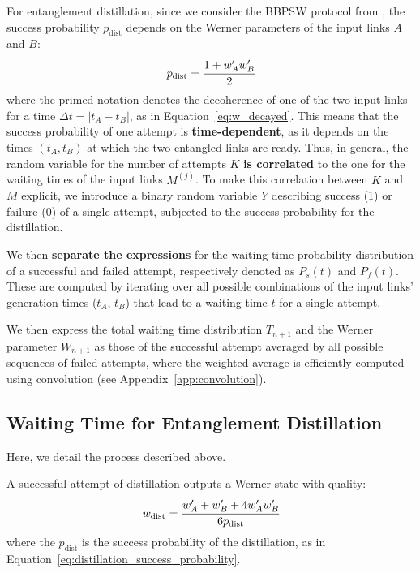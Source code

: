 \documentclass{masterthesis}
\begin{document}
For entanglement distillation, since we consider the BBPSW protocol from \textcite{bennett1996purification}, the success probability $p_\text{dist}$ depends on the Werner parameters of the input links $A$ and $B$:
\begin{equation}\label{eq:distillation_success_probability}
    p_\text{dist} = \cfrac{1+w_A'w_B'}{2}
\end{equation}
where the primed notation denotes the decoherence of one of the two input links for a time $\Delta t = |t_A - t_B|$, as in Equation~\ref{eq:w_decayed}.
This means that the success probability of one attempt is \textbf{time-dependent}, as it depends on the times $(t_A, t_B)$ at which the two entangled links are ready.
Thus, in general, the random variable for the number of attempts $K$ \textbf{is correlated} to the one for the waiting times of the input links $M^{(j)}$.
To make this correlation between $K$ and $M$ explicit, we introduce a binary random variable $Y$ describing success (1) or failure (0) of a single attempt, subjected to the success probability for the distillation.

We then \textbf{separate the expressions} for the waiting time probability distribution of a successful and failed attempt, respectively denoted as $P_s(t)$ and $P_f(t)$.
These are computed by iterating over all possible combinations of the input links' generation times ($t_A$, $t_B$) that lead to a waiting time $t$ for a single attempt.

We then express the total waiting time distribution $T_{n+1}$ and the Werner parameter $W_{n+1}$ as those of the successful attempt averaged by all possible sequences of failed attempts, where the weighted average is efficiently computed using convolution (see Appendix~\ref{app:convolution}).

\subsection{Waiting Time for Entanglement Distillation}

Here, we detail the process described above.

A successful attempt of distillation outputs a Werner state with quality:
\begin{equation}
    w_\text{dist} = \cfrac{w_A' + w_B' + 4 w_A' w_B'}{6 p_\text{dist}}
\end{equation}
where the $p_\text{dist}$ is the success probability of the distillation, as in Equation~\ref{eq:distillation_success_probability}.
\end{document}

